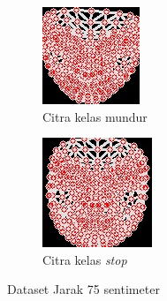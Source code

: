 \begin{figure}[H]
  \begin{subfigure}{0.3\textwidth}
      \centering
      \includegraphics[width=\linewidth]{gambar/75 mundur.jpg}
      \caption{Citra kelas mundur}
      \label{fig:image4}
  \end{subfigure}
  \hfill
  \begin{subfigure}{0.3\textwidth}
      \centering
      \includegraphics[width=\linewidth]{gambar/75 stop.jpg}
      \caption{Citra kelas \emph{stop}}
      \label{fig:image5}
  \end{subfigure}
  \caption{Dataset Jarak 75 sentimeter}
  \label{fig:15lux}
\end{figure}



